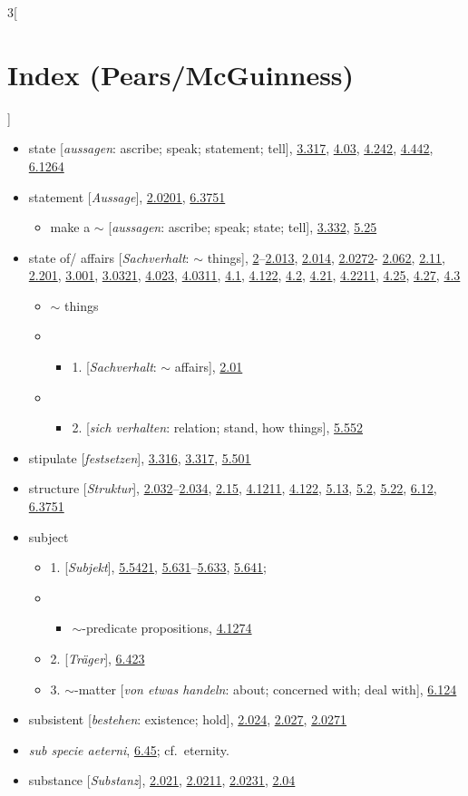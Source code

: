\documentclass[oneside,openany,12pt]{book}
\newcommand{\indexentry}[1]{\item #1}
\newcommand{\indexsubentry}[1]{\begin{itemize} \item #1 \end{itemize}}
\newcommand{\indexsubsubentry}[1]{\begin{itemize} \item \begin{itemize} \item #1 \end{itemize} \end{itemize}}
\newcommand{\indexref}[1]{\hyperlink{prop#1}{#1}}
\begin{document}
\begin{multicols}{3}[\section*{Index (Pears/McGuinness)}]
\begin{itemize}
\indexentry{state [\textit{aussagen}: ascribe; speak; statement; tell], \indexref{3.317}, \indexref{4.03}, \indexref{4.242}, \indexref{4.442}, \indexref{6.1264}}

\indexentry{statement [\textit{Aussage}], \indexref{2.0201}, \indexref{6.3751}}

   \indexsubentry{make a $\sim$ [\textit{aussagen}: ascribe; speak; state; tell], \indexref{3.332}, \indexref{5.25}}

\indexentry{state of/ affairs [\textit{Sachverhalt}: $\sim$ things], \indexref{2}--\indexref{2.013}, \indexref{2.014}, \indexref{2.0272}- \indexref{2.062}, \indexref{2.11}, \indexref{2.201}, \indexref{3.001}, \indexref{3.0321}, \indexref{4.023}, \indexref{4.0311}, \indexref{4.1}, \indexref{4.122}, \indexref{4.2}, \indexref{4.21}, \indexref{4.2211}, \indexref{4.25}, \indexref{4.27}, \indexref{4.3}}

   \indexsubentry{$\sim$ things}

   \indexsubsubentry{1. [\textit{Sachverhalt}: $\sim$ affairs], \indexref{2.01}}

   \indexsubsubentry{2. [\textit{sich verhalten}: relation; stand, how things], \indexref{5.552}}

\indexentry{stipulate [\textit{festsetzen}], \indexref{3.316}, \indexref{3.317}, \indexref{5.501}}

\indexentry{structure [\textit{Struktur}], \indexref{2.032}--\indexref{2.034}, \indexref{2.15}, \indexref{4.1211}, \indexref{4.122}, \indexref{5.13}, \indexref{5.2}, \indexref{5.22}, \indexref{6.12}, \indexref{6.3751}}

\indexentry{subject}

   \indexsubentry{1. [\textit{Subjekt}], \indexref{5.5421}, \indexref{5.631}--\indexref{5.633}, \indexref{5.641};}

   \indexsubsubentry{$\sim$-predicate propositions, \indexref{4.1274}}

   \indexsubentry{2. [\textit{Tr{\"a}ger}], \indexref{6.423}}

   \indexsubentry{3. $\sim$-matter [\textit{von etwas handeln}: about; concerned with; deal with], \indexref{6.124}}

\indexentry{subsistent [\textit{bestehen}: existence; hold], \indexref{2.024}, \indexref{2.027}, \indexref{2.0271}}

\indexentry{\textit{sub specie aeterni}, \indexref{6.45}; cf.\ eternity.}

\indexentry{substance [\textit{Substanz}], \indexref{2.021}, \indexref{2.0211}, \indexref{2.0231}, \indexref{2.04}}


\end{itemize}
\end{multicols}
\end{document}
